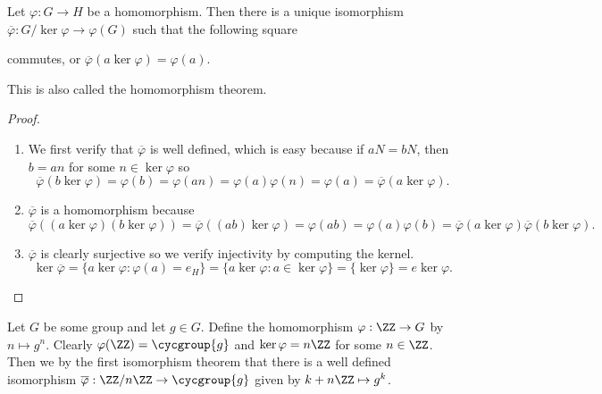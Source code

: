 \begin{thm}
Let $\varphi : G \to H$ be a homomorphism. Then there is a unique
isomorphism $\overline{\varphi} : G / \ker\varphi \to \varphi(G)$ such
that the following square
\begin{center}
\end{center}
commutes, or $\overline{\varphi}(a\ker\varphi) = \varphi(a)$.

This is also called the homomorphism theorem.
\end{thm}

\begin{proof}
$ $
\begin{enumerate}
\item We first verify that $\overline\varphi$ is well defined, which is
easy because if $aN = bN$, then $b = an$ for some $n \in \ker\varphi$ so
\[ \overline\varphi(b\ker\varphi) = \varphi(b) = \varphi(an) =
\varphi(a)\varphi(n) = \varphi(a) = \overline\varphi(a\ker\varphi). \]
\item $\overline\varphi$ is a homomorphism because
\[ \overline\varphi((a\ker\varphi)(b\ker\varphi)) =
\overline\varphi((ab)\ker\varphi) = \varphi(ab) = \varphi(a)\varphi(b) =
\overline\varphi(a\ker\varphi) \overline\varphi(b\ker\varphi). \]
\item $\overline\varphi$ is clearly surjective so we verify injectivity
by computing the kernel.
\[ \ker\overline\varphi = \lbrace a\ker\varphi : \varphi(a) = e_H
\rbrace = \lbrace a\ker\varphi : a \in \ker\varphi \rbrace = \lbrace
\ker\varphi \rbrace = e\ker\varphi. \]
\end{enumerate}
\end{proof}

\begin{ex}
Let $G$ be some group and let $g \in G$. Define the homomorphism
$\varphi : \ZZ \to G$ by $n \mapsto g^n$. Clearly $\varphi(\ZZ) =
\cycgroup{g}$ and $\ker\varphi = n\ZZ$ for some $n \in \ZZ$. Then we
by the first isomorphism theorem that there is a well defined
isomorphism $\overline\varphi : \ZZ / n\ZZ \to \cycgroup{g}$ given by
$k + n\ZZ \mapsto g^k$.
\end{ex}
